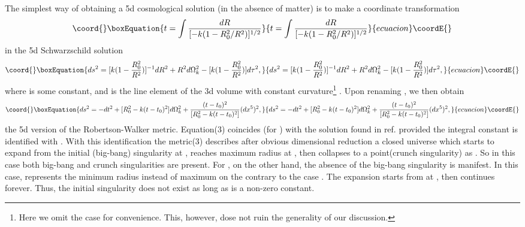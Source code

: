 \documentclass[a4paper,12pt]{article}
\begin{document}
The simplest way of obtaining a 5d cosmological solution (in the
absence of matter) is to make a coordinate transformation
\begin{equation}\coord{}\boxEquation{
t= \int \frac{dR}{[-k(1-{R^2_0}/{R^2})]^{1/2}}
}{
t= \int \frac{dR}{[-k(1-{R^2_0}/{R^2})]^{1/2}}
}{ecuacion}\coordE{}\end{equation}
in the 5d Schwarzschild solution
\begin{equation}\coord{}\boxEquation{
ds^2=[ k(1-\frac{R^2_0}{R^2}) ]^{-1}dR^2 + R^2d\Omega^2_k - [
k(1-\frac{R^2_0}{R^2} )] d\tau^2 ,
}{
ds^2=[ k(1-\frac{R^2_0}{R^2}) ]^{-1}dR^2 + R^2d\Omega^2_k - [
k(1-\frac{R^2_0}{R^2} )] d\tau^2 ,
}{ecuacion}\coordE{}\end{equation}
where \coordHE{} is some constant, and \coordHE{} is the line
element of the 3d volume with constant curvature\footnote{Here we
omit the case \coordHE{} for convenience. This, however, dose not ruin
the generality of our discussion.} \coordHE{}. Upon renaming \coordHE{}, we then obtain
\begin{equation}\coord{}\boxEquation{
ds^2=-dt^2+[ R^2_0-k(t-t_0)^2]d\Omega^2_k +
\frac{(t-t_0)^2}{[R^2_0-k(t-t_0)^2]}(dx^5)^2 ,
}{
ds^2=-dt^2+[ R^2_0-k(t-t_0)^2]d\Omega^2_k +
\frac{(t-t_0)^2}{[R^2_0-k(t-t_0)^2]}(dx^5)^2 ,
}{ecuacion}\coordE{}\end{equation}
the 5d version of the Robertson-Walker metric. Equation(3)
coincides (for \coordHE{}) with the solution found in ref.\cite{mat}
provided the integral constant \coordHE{} is identified with \coordHE{}.
With this identification the metric(3) describes after obvious
dimensional reduction a closed universe which starts
 to expand from the initial (big-bang) singularity at \coordHE{},
reaches maximum radius \coordHE{} at \coordHE{}, then collapses to a
point(crunch singularity) as \coordHE{}. So in this case
both big-bang and crunch singularities are present. For \coordHE{}, on
the other hand, the absence of the big-bang singularity is
manifest. In this case, \coordHE{} represents the minimum radius
instead of maximum on the contrary to the case \coordHE{}. The
expansion starts from \coordHE{} at \coordHE{}, then continues forever.
Thus, the initial singularity does not exist as long as \coordHE{} is a
non-zero constant.
\end{document}
